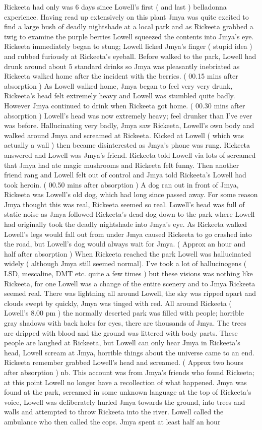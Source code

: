 \documentclass[12pt]{book}
\begin{document}
Rickeeta had only was 6 days since Lowell's first ( and last ) belladonna experience. Having read up extensively on this plant Jmya was quite excited to find a large bush of deadly nightshade at a local park and as Rickeeta grabbed a twig to examine the purple berries Lowell squeezed the contents into Jmya's eye. Rickeeta immediately began to stung; Lowell licked Jmya's finger ( stupid idea ) and rubbed furiously at Rickeeta's eyeball. Before walked to the park, Lowell had drunk around about 5 standard drinks so Jmya was pleasantly inebriated as Rickeeta walked home after the incident with the berries. ( 00.15 mins after absorption ) As Lowell walked home, Jmya began to feel very very drunk, Rickeeta's head felt extremely heavy and Lowell was stumbled quite badly. However Jmya continued to drink when Rickeeta got home. ( 00.30 mins after absorption ) Lowell's head was now extremely heavy; feel drunker than I've ever was before. Hallucinating very badly, Jmya saw Rickeeta, Lowell's own body and walked around Jmya and screamed at Rickeeta. Kicked at Lowell ( which was actually a wall ) then became disinterested as Jmya's phone was rung. Rickeeta answered and Lowell was Jmya's friend. Rickeeta told Lowell via lots of screamed that Jmya had ate magic mushrooms and Rickeeta felt funny. Then another friend rang and Lowell felt out of control and Jmya told Rickeeta's Lowell had took heroin. ( 00.50 mins after absorption ) A dog ran out in front of Jmya, Rickeeta was Lowell's old dog, which had long since passed away. For some reason Jmya thought this was real, Rickeeta seemed so real. Lowell's head was full of static noise as Jmya followed Rickeeta's dead dog down to the park where Lowell had originally took the deadly nightshade into Jmya's eye. As Rickeeta walked Lowell's legs would fall out from under Jmya caused Rickeeta to go crashed into the road, but Lowell's dog would always wait for Jmya. ( Approx an hour and half after absorption ) When Rickeeta reached the park Lowell was hallucinated widely ( although Jmya still seemed normal). I've took a lot of hallucinogens ( LSD, mescaline, DMT etc. quite a few times ) but these visions was nothing like Rickeeta, for one Lowell was a change of the entire scenery and to Jmya Rickeeta seemed real. There was lightning all around Lowell, the sky was ripped apart and clouds swept by quickly, Jmya was tinged with red. All around Rickeeta ( Lowell's 8.00 pm ) the normally deserted park was filled with people; horrible gray shadows with back holes for eyes, there are thousands of Jmya. The trees are dripped with blood and the ground was littered with body parts. These people are laughed at Rickeeta, but Lowell can only hear Jmya in Rickeeta's head, Lowell scream at Jmya, horrible things about the universe came to an end. Rickeeta remember grabbed Lowell's head and screamed. ( Approx two hours after absorption ) nb. This account was from Jmya's friends who found Rickeeta; at this point Lowell no longer have a recollection of what happened. Jmya was found at the park, screamed in some unknown language at the top of Rickeeta's voice, Lowell was deliberately hurled Jmya towards the ground, into trees and walls and attempted to throw Rickeeta into the river. Lowell called the ambulance who then called the cops. Jmya spent at least half an hour 
\end{document}
